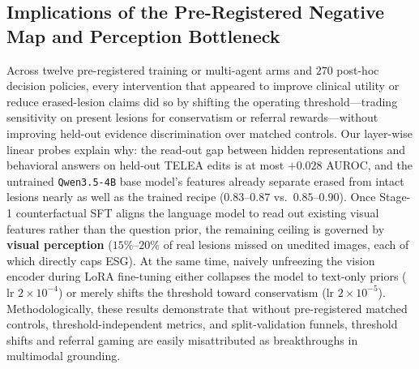 \documentclass{article} %
\begin{document}
\subsection{Implications of the Pre-Registered Negative Map and Perception Bottleneck}
\label{subsec:disc_negative_map}
Across twelve pre-registered training or multi-agent arms and $270$ post-hoc decision policies, every intervention that appeared to improve clinical utility or reduce erased-lesion claims did so by shifting the operating threshold---trading sensitivity on present lesions for conservatism or referral rewards---without improving held-out evidence discrimination over matched controls. Our layer-wise linear probes explain why: the read-out gap between hidden representations and behavioral answers on held-out TELEA edits is at most $+0.028$ AUROC, and the untrained \texttt{Qwen3.5-4B} base model's features already separate erased from intact lesions nearly as well as the trained recipe ($0.83\text{--}0.87$ vs.\ $0.85\text{--}0.90$). Once Stage-1 counterfactual SFT aligns the language model to read out existing visual features rather than the question prior, the remaining ceiling is governed by \textbf{visual perception} ($15\%\text{--}20\%$ of real lesions missed on unedited images, each of which directly caps ESG). At the same time, naively unfreezing the vision encoder during LoRA fine-tuning either collapses the model to text-only priors ($\text{lr } 2\times 10^{-4}$) or merely shifts the threshold toward conservatism ($\text{lr } 2\times 10^{-5}$). Methodologically, these results demonstrate that without pre-registered matched controls, threshold-independent metrics, and split-validation funnels, threshold shifts and referral gaming are easily misattributed as breakthroughs in multimodal grounding.
\end{document}
